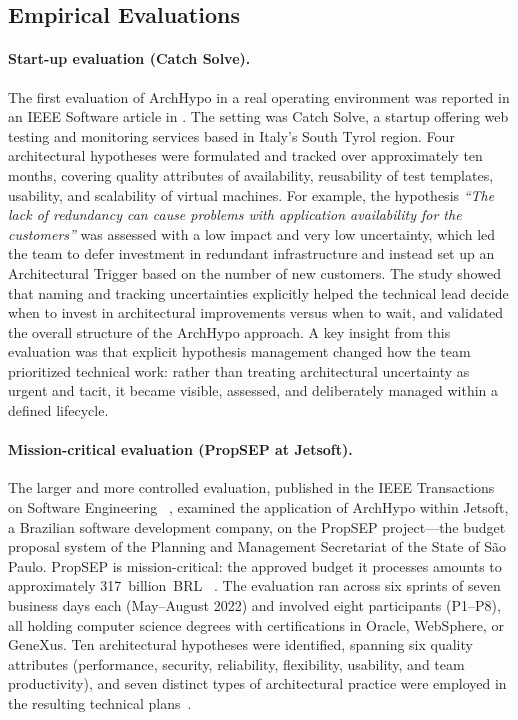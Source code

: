 \subsection{Empirical Evaluations}
\label{subsec:archhypo-evaluations}

\paragraph{Start-up evaluation (Catch Solve).}
The first evaluation of ArchHypo in a real operating environment was reported in an
IEEE Software article in \citet{silva2024ieeesw}. The setting was Catch
Solve, a startup offering web testing and monitoring services based in Italy's South
Tyrol region. Four architectural hypotheses were formulated and
tracked over approximately ten months, covering quality attributes of availability,
reusability of test templates, usability, and scalability of virtual machines. For
example, the hypothesis \emph{``The lack of redundancy can cause problems with
application availability for the customers''} was assessed with a low impact and very
low uncertainty, which led the team to defer investment in redundant infrastructure and
instead set up an Architectural Trigger based on the number of new
customers. The study showed that naming and tracking
uncertainties explicitly helped the technical lead decide when to invest in architectural
improvements versus when to wait, and validated the overall structure of the ArchHypo
approach. A key insight from this evaluation was that explicit hypothesis management
changed how the team prioritized technical work: rather than treating architectural
uncertainty as urgent and tacit, it became visible, assessed, and deliberately managed
within a defined lifecycle.

\paragraph{Mission-critical evaluation (PropSEP at Jetsoft).}
The larger and more controlled evaluation, published in the IEEE Transactions on
Software Engineering ~\citep{silva2024tse}, examined the application of ArchHypo within
Jetsoft, a Brazilian software development company, on the PropSEP project---the budget
proposal system of the Planning and Management Secretariat of the State of São Paulo.
PropSEP is mission-critical: the approved budget it processes amounts to approximately
317~billion~BRL ~\citep{silva2024tse}. The evaluation ran across six sprints of seven
business days each (May--August 2022) and involved eight participants (P1--P8), all
holding computer science degrees with certifications in Oracle, WebSphere, or GeneXus.
Ten architectural hypotheses were identified, spanning six quality attributes
(performance, security, reliability, flexibility, usability, and team productivity), and
seven distinct types of architectural practice were employed in the resulting technical
plans~\citep{silva2024tse}.

